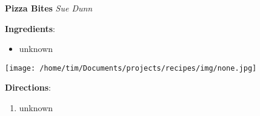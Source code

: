 \documentclass[11pt, twoside, openany]{book}
\begin{document}
\noindent\begin{minipage}[t]{\linewidth}%
{\Large\textbf{Pizza Bites}} \label{pizza-bites}\hfill\textit{Sue Dunn}\\
\noindent\begin{minipage}[t]{0.78\linewidth}%
\textbf{Ingredients}:\vspace{-3mm}
\begin{multicols}{2}
\begin{itemize}\setlength\itemsep{-1mm}
\item unknown
\end{itemize}
\end{multicols}
\end{minipage}
\noindent\begin{minipage}[t]{0.18\linewidth}
\centering \strut\vspace*{-\baselineskip}\newline
\texttt{[image: /home/tim/Documents/projects/recipes/img/none.jpg]}\\
\end{minipage}\vspace{3mm}
\textbf{Directions}:
\vspace{-3mm}\begin{enumerate}\setlength\itemsep{-1mm}
\item unknown
\end{enumerate}
\end{minipage}\vspace{8mm}
\end{document}
